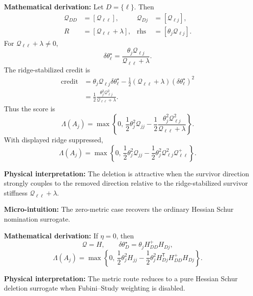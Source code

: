 \documentclass[10pt,twocolumn]{article}
\newcommand{\rhs}{\mathrm{rhs}}
\newcommand{\blocktitle}[1]{\vspace{2pt}\noindent\textbf{#1}\space}
\newcommand{\micro}[1]{\blocktitle{Micro-intuition:} #1}
\newcommand{\deriv}{\blocktitle{Mathematical derivation:}}
\newcommand{\phys}[1]{\blocktitle{Physical interpretation:} #1}
\begin{document}
\deriv
Let \(D=\{\ell\}\). Then
\[
\begin{aligned}
\mathcal Q_{DD}&=[\mathcal Q_{\ell\ell}],
&
\mathcal Q_{Dj}&=[\mathcal Q_{\ell j}],
\\
R&=[\mathcal Q_{\ell\ell}+\lambda],
&
\rhs&=[\theta_j\mathcal Q_{\ell j}].
\end{aligned}
\]
For \(\mathcal Q_{\ell\ell}+\lambda\ne0\),
\[
\delta\theta_\ell^\star
=
\frac{\theta_j\mathcal Q_{\ell j}}{\mathcal Q_{\ell\ell}+\lambda}.
\]
The ridge-stabilized credit is
\[
\begin{aligned}
\mathrm{credit}
&=
\theta_j\mathcal Q_{\ell j}\delta\theta_\ell^\star
-\frac12(\mathcal Q_{\ell\ell}+\lambda)(\delta\theta_\ell^\star)^2
\\
&=
\frac12
\frac{\theta_j^2\mathcal Q_{\ell j}^2}{\mathcal Q_{\ell\ell}+\lambda}.
\end{aligned}
\]
Thus the score is
\[
\Lambda(A_j)
=
\max\left\{
0,\,
\frac12\theta_j^2\mathcal Q_{jj}
-\frac12
\frac{\theta_j^2\mathcal Q_{\ell j}^2}{\mathcal Q_{\ell\ell}+\lambda}
\right\}.
\]
With displayed ridge suppressed,
\[
\Lambda(A_j)
=
\max\left\{
0,\,
\frac12\theta_j^2\mathcal Q_{jj}
-\frac12\theta_j^2\mathcal Q_{\ell j}^2\mathcal Q_{\ell\ell}^{+}
\right\}.
\]

\phys{The deletion is attractive when the survivor direction strongly couples to the removed direction relative to the ridge-stabilized survivor stiffness \(\mathcal Q_{\ell\ell}+\lambda\).}

\micro{The zero-metric case recovers the ordinary Hessian Schur nomination surrogate.}

\deriv
If \(\eta=0\), then
\[
\mathcal Q=H,
\qquad
\delta\theta_D^\star
=
\theta_jH_{DD}^{+}H_{Dj},
\]
\[
\Lambda(A_j)
=
\max\left\{
0,\,
\frac12\theta_j^2H_{jj}
-\frac12\theta_j^2H_{Dj}^{\mathsf T}H_{DD}^{+}H_{Dj}
\right\}.
\]

\phys{The metric route reduces to a pure Hessian Schur deletion surrogate when Fubini--Study weighting is disabled.}
\end{document}
